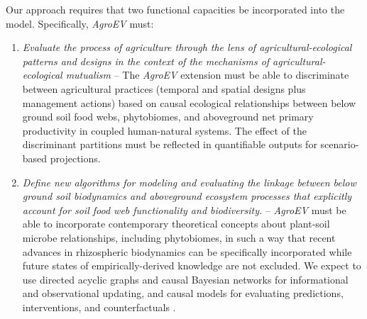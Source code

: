 \documentclass[12pt, letterpaper]{article}
\begin{document}
Our approach requires that two functional capacities be incorporated into the model. Specifically, \textit{AgroEV} must:
\begin{enumerate}
  \item \textit{Evaluate the process of agriculture through the lens of agricultural-ecological patterns and designs in the context of the mechanisms of agricultural-ecological mutualism} -- The \textit{AgroEV} extension must be able to discriminate between agricultural practices (temporal and spatial designs plus management actions) based on causal ecological relationships between below ground soil food webs, phytobiomes, and aboveground net primary productivity in coupled human-natural systems. The effect of the discriminant partitions must be reflected in quantifiable outputs for scenario-based projections.
  \item \textit{Define new algorithms for modeling and evaluating the linkage between below ground soil biodynamics and aboveground ecosystem processes that explicitly account for soil food web functionality and biodiversity.} -- \textit{AgroEV} must be able to incorporate contemporary theoretical concepts about plant-soil microbe relationships, including phytobiomes, in such a way that recent advances in rhizospheric biodynamics can be specifically incorporated while future states of empirically-derived knowledge are not excluded. We expect to use directed acyclic graphs and causal Bayesian networks for informational and observational updating, and causal models for evaluating predictions, interventions, and counterfactuals \citep{lunn_bugs_2013,jaynes_probability_2003, pearl_causality:_2000}.
\end{enumerate}
\end{document}
